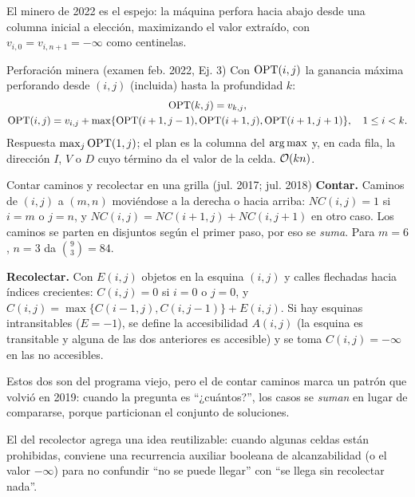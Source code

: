 El minero de 2022 es el espejo: la máquina perfora hacia abajo desde una
columna inicial a elección, maximizando el valor extraído, con
$v_{i,0}=v_{i,n+1}=-\infty$ como centinelas.

\begin{problema}{Perforación minera (examen feb. 2022, Ej. 3)}
Con $\mathrm{OPT}(i,j)$ la ganancia máxima perforando desde $(i,j)$ (incluida) hasta
la profundidad $k$:
\begin{gather*}
\mathrm{OPT}(k,j)=v_{k,j},\\
\mathrm{OPT}(i,j)=v_{i,j}+\max\{\mathrm{OPT}(i+1,j-1),\mathrm{OPT}(i+1,j),\mathrm{OPT}(i+1,j+1)\},\quad 1\le i<k.
\end{gather*}
Respuesta $\max_j\mathrm{OPT}(1,j)$; el plan es la columna del $\operatorname*{arg\,max}$ y, en cada
fila, la dirección $I$, $V$ o $D$ cuyo término da el valor de la celda.
$\mathcal{O}(kn)$.
\end{problema}

\begin{problema}{Contar caminos y recolectar en una grilla (jul. 2017; jul. 2018)}
\textbf{Contar.} Caminos de $(i,j)$ a $(m,n)$ moviéndose a la derecha o
hacia arriba: $\mathit{NC}(i,j)=1$ si $i=m$ o $j=n$, y
$\mathit{NC}(i,j)=\mathit{NC}(i+1,j)+\mathit{NC}(i,j+1)$ en otro caso. Los caminos se parten en
disjuntos según el primer paso, por eso se \emph{suma}. Para $m=6$, $n=3$
da $\binom{9}{3}=84$.

\textbf{Recolectar.} Con $E(i,j)$ objetos en la esquina $(i,j)$ y calles
flechadas hacia índices crecientes: $C(i,j)=0$ si $i=0$ o $j=0$, y
$C(i,j)=\max\{C(i-1,j),C(i,j-1)\}+E(i,j)$. Si hay esquinas intransitables
($E=-1$), se define la accesibilidad $A(i,j)$ (la esquina es transitable y
alguna de las dos anteriores es accesible) y se toma $C(i,j)=-\infty$ en las
no accesibles.
\end{problema}

Estos dos son del programa viejo, pero el de contar caminos marca un
patrón que volvió en 2019: cuando la pregunta es ``¿cuántos?'', los casos
se \emph{suman} en lugar de compararse, porque particionan el conjunto
de soluciones.

El del recolector agrega una idea reutilizable: cuando algunas celdas están
prohibidas, conviene una recurrencia auxiliar booleana de alcanzabilidad (o
el valor $-\infty$) para no confundir ``no se puede llegar'' con ``se llega
sin recolectar nada''.

